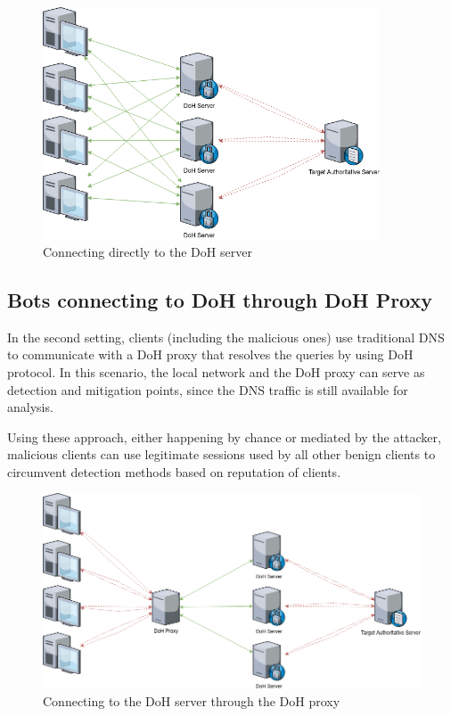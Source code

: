 \documentclass[11pt]{article}
\begin{document}
    \begin{figure}[h]
        \includegraphics[width=10cm]{direct.png}
        \caption{Connecting directly to the DoH server}
    \end{figure}

    \subsection{Bots connecting to DoH through DoH Proxy}

    In the second setting, clients (including the malicious ones) use traditional DNS to communicate with a DoH proxy that resolves the queries by using DoH protocol.
    In this scenario, the local network and the DoH proxy can serve as detection and mitigation points, since the DNS traffic is still available for analysis.

    Using these approach, either happening by chance or mediated by the attacker, malicious clients can use legitimate sessions used by all other benign clients to circumvent detection methods based on reputation of clients.

    \begin{figure}[h]
        \includegraphics[width=\textwidth]{proxied.png}
        \caption{Connecting to the DoH server through the DoH proxy}
    \end{figure}
\end{document}
